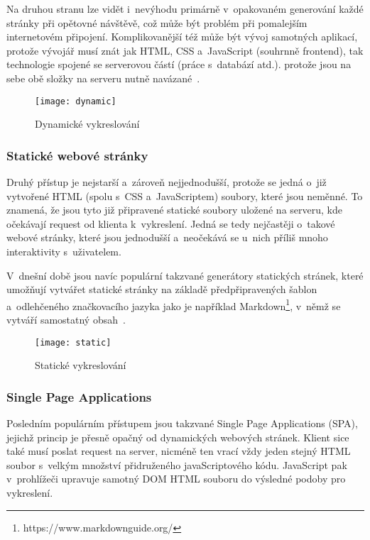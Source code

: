 Na druhou stranu lze vidět i~nevýhodu primárně v~opakovaném generování každé stránky při opětovné návštěvě, což může být problém při pomalejším internetovém připojení. Komplikovanější též může být vývoj samotných aplikací, protože vývojář musí znát jak HTML, CSS a~JavaScript (souhrnně frontend), tak technologie spojené se serverovou částí (práce s~databází atd.). protože jsou na sebe obě složky na serveru nutně navázané~\parencite{spa}.

\begin{figure}[ht]   
    \centering
    \texttt{[image: dynamic]}  
    \caption{Dynamické vykreslování}
    \label{dynamic}
 \end{figure}

\hypertarget{statickuxe9-webovuxe9-struxe1nky}{%
\subsubsection{Statické webové stránky}\label{statickuxe9-webovuxe9-struxe1nky}}

Druhý přístup je nejstarší a~zároveň nejjednodušší, protože se jedná o~již vytvořené HTML (spolu s~CSS a~JavaScriptem) soubory, které jsou neměnné. To znamená, že jsou tyto již připravené statické soubory uložené na serveru, kde očekávají request od klienta k~vykreslení. Jedná se tedy nejčastěji o~takové webové stránky, které jsou jednodušší a~neočekává se u~nich příliš mnoho interaktivity s~uživatelem.

V~dnešní době jsou navíc populární takzvané generátory statických stránek, které umožňují vytvářet statické stránky na základě předpřipravených šablon a~odlehčeného značkovacího jazyka jako je například Markdown\footnote{https://www.markdownguide.org/}, v~němž se vytváří samostatný obsah~\parencite{spa}.

\begin{figure}[ht]   
    \centering
    \texttt{[image: static]}  
    \caption{Statické vykreslování}
    \label{static}
 \end{figure}

\hypertarget{single-page-applications}{%
\subsubsection{Single Page Applications}\label{single-page-applications}}

Posledním populárním přístupem jsou takzvané Single Page Applications (SPA), jejichž princip je přesně opačný od dynamických webových stránek. Klient sice také musí poslat request na server, nicméně ten vrací vždy jeden stejný HTML soubor s~velkým množství přidruženého javaScriptového kódu. JavaScript pak v~prohlížeči upravuje samotný DOM HTML souboru do výsledné podoby pro vykreslení.

